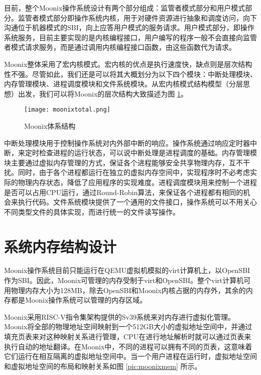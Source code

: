 目前，整个Moonix操作系统设计有两个部分组成：监管者模式部分和用户模式部分。监管者模式部分即操作系统内核，用于对硬件资源进行抽象和调度访问，向下沟通位于机器模式的SBI，向上应答用户模式的服务请求。用户模式部分，即操作系统服务，目前主要实现的是内核编程接口，用户编写的程序一般不会直接向监管者模式请求服务，而是通过调用内核编程接口函数，由这些函数代为请求。

Moonix整体采用了宏内核模式。宏内核的优点是执行速度快，缺点则是层次结构性不强。尽管如此，我们还是可以将其大概划分为以下四个模块：中断处理模块、内存管理模块、进程调度模块和文件系统模块。从宏内核模式结构模型（分层思想）出发，我们可以将Moonix的层次结构大致描述为图 \ref{pic:moonixtotal}。

\begin{figure}[htpb]
	\centering
	\texttt{[image: moonixtotal.png]}
	\setlength{\abovecaptionskip}{2pt}
	\caption{Moonix体系结构}
	\label{pic:moonixtotal}
\end{figure}

中断处理模块用于控制操作系统对内外部中断的响应。操作系统通过响应定时器中断，来定时检查进程的运行状态，可以说中断处理是进程调度的基础。内存管理模块主要通过虚拟内存管理的方式，保证各个进程能够安全共享物理内存，互不干扰。同时，由于各个进程都运行在独立的虚拟内存空间中，实现程序时不必考虑实际的物理内存状态，降低了应用程序的实现难度。进程调度模块用来控制一个进程是否可以占用CPU运行，通过Round-Robin算法\cite{DBLP:journals/eor/RasmussenT08}，来保证各个进程都有相同的机会来执行代码。文件系统模块提供了一个通用的文件接口，操作系统可以不用关心不同类型文件的具体实现，而进行统一的文件读写操作。

\section{系统内存结构设计}

Moonix操作系统目前只能运行在QEMU虚拟机模拟的virt计算机上\cite{qemu/virt}，以OpenSBI作为SBI。因此，Moonix可管理的内存受制于virt和OpenSBI。整个virt计算机可用物理内存大小为128MB，除去OpenSBI和Moonix内核占据的内存外，其余的内存都是Moonix操作系统可以管理的内存区域。

Moonix采用RISC-V指令集架构提供的Sv39系统来对内存进行虚拟化管理。Moonix将全部的物理地址空间映射到一个512GB大小的虚拟地址空间中，并通过填充页表来对这种映射关系进行管理，CPU在进行地址解析时就可以通过页表来执行自动的地址翻译。在Moonix中，不同的进程可以拥有不同的页表，这意味着它们运行在相互隔离的虚拟地址空间中。当一个用户进程在运行时，虚拟地址空间和虚拟地址空间的布局和映射关系如图 \ref{pic:moonixmem} 所示。

